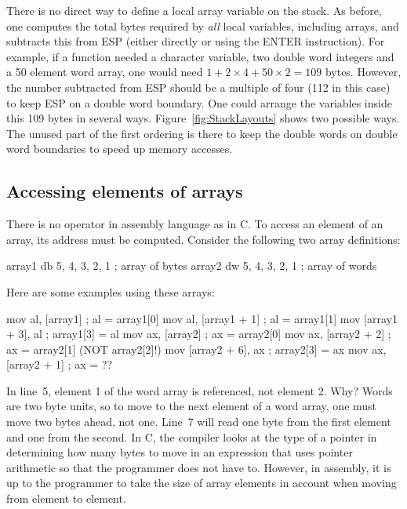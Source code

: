 There is no direct way to define a local array variable on the
stack. As before, one computes the total bytes required by \emph{all}
local variables, including arrays, and subtracts this from ESP (either
directly or using the {\code ENTER} instruction). For example, if a
function needed a character variable, two double word integers and a
50 element word array, one would need $1 + 2 \times 4 + 50 \times 2 =
109$ bytes. However, the number subtracted from ESP should be a
multiple of four (112 in this case) to keep ESP on a double word
boundary. One could arrange the variables inside this 109 bytes in
several ways. Figure~\ref{fig:StackLayouts} shows two possible ways. The
unused part of the first ordering is there to keep the double words on
double word boundaries to speed up memory accesses.

\subsection{Accessing elements of arrays}

There is no {\code [ ]} operator in assembly language as in C. To
access an element of an array, its address must be computed. Consider
the following two array definitions:
\begin{AsmCodeListing}[frame=none, numbers=none]
array1       db     5, 4, 3, 2, 1     ; array of bytes
array2       dw     5, 4, 3, 2, 1     ; array of words
\end{AsmCodeListing}
Here are some examples using these arrays:
\begin{AsmCodeListing}[frame=none]
      mov    al, [array1]             ; al = array1[0]
      mov    al, [array1 + 1]         ; al = array1[1]
      mov    [array1 + 3], al         ; array1[3] = al
      mov    ax, [array2]             ; ax = array2[0]
      mov    ax, [array2 + 2]         ; ax = array2[1] (NOT array2[2]!)
      mov    [array2 + 6], ax         ; array2[3] = ax
      mov    ax, [array2 + 1]         ; ax = ??
\end{AsmCodeListing}
In line~5, element 1 of the word array is referenced, not element 2. Why?
Words are two byte units, so to move to the next element of a word array,
one must move two bytes ahead, not one. Line~7 will read one byte from the
first element and one from the second. In C, the compiler looks at the type
of a pointer in determining how many bytes to move in an expression that
uses pointer arithmetic so that the programmer does not have to. However,
in assembly, it is up to the programmer to take the size of array elements
in account when moving from element to element.

